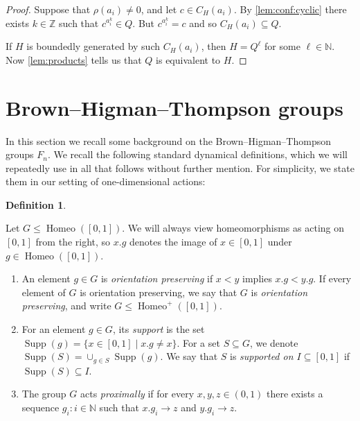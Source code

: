 \documentclass[reqno,12pt]{amsart}\setcounter{tocdepth}{1}
\theoremstyle{definition}
\newtheorem{definition}[theorem]{Definition}
\newcommand{\N}{\mathbb{N}}
\newcommand{\Z}{\mathbb{Z}}
\DeclareMathOperator{\Homeo}{Homeo}
\DeclareMathOperator{\Supp}{Supp}
\numberwithin{equation}{section}
\begin{document}
\begin{proof}
Suppose that $\rho(a_i) \neq 0$, and let $c\in C_H(a_i)$. By \cref{lem:conf:cyclic} there exists $k \in \Z$ such that $c^{a_i^k} \in Q$. But $c^{a_i^k} = c$ and so $C_H(a_i) \subseteq Q$.

If $H$ is boundedly generated by such $C_H(a_i)$, then $H=Q^\ell$ for some $\ell\in\N$. Now \cref{lem:products} tells us that $Q$ is equivalent to $H$.
\end{proof}



\section{Brown--Higman--Thompson groups}\label{sec:thompson}

In this section we recall some background on the Brown--Higman--Thompson groups $F_n$. We recall the following standard dynamical definitions, which we will repeatedly use in all that follows without further mention. For simplicity, we state them in our setting of one-dimensional actions:

\begin{definition}
\label{def:dynamical}

Let $G \leq \Homeo([0, 1])$. We will always view homeomorphisms as acting on $[0,1]$ from the right, so $x.g$ denotes the image of $x\in [0,1]$ under $g\in\Homeo([0,1])$.
\begin{enumerate}
\item An element $g \in G$ is \emph{orientation preserving} if $x < y$ implies $x.g < y.g$. If every element of $G$ is orientation preserving, we say that $G$ is \emph{orientation preserving}, and write $G \leq \Homeo^+([0, 1])$.
\item For an element $g \in G$, its \emph{support} is the set $\Supp(g) = \{ x \in [0, 1] \mid x.g \neq x \}$. For a set $S \subseteq G$, we denote $\Supp(S) = \cup_{g \in S} \Supp(g)$. We say that $S$ is \emph{supported on $I \subseteq [0, 1]$} if $\Supp(S) \subseteq I$.
\item The group $G$ acts \emph{proximally} if for every $x, y, z \in (0, 1)$ there exists a sequence $g_i : i \in \N$ such that $x.g_i \to z$ and $y.g_i \to z$.
\end{enumerate}
\end{definition}
\end{document}

